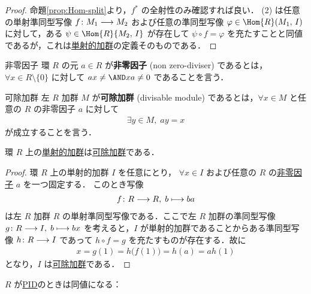\documentclass[algtopo_main]{subfiles}
\begin{document}
\begin{proof}
    命題\ref{prop:Hom-split}より，$f^*$ の全射性のみ確認すれば良い．
    (2) は任意の単射準同型写像 $f \colon M_1 \longrightarrow M_2$ および任意の準同型写像 $\varphi \in \Hom{R}(M_1,\, I)$ に対して，ある $\psi \in \Hom{R}{M_2,\, I}$ が存在して $\psi \circ f = \varphi$ を充たすことと同値であるが，これは\hyperref[def:inj-mod]{単射的加群}の定義そのものである．
\end{proof}

\begin{mydef}[label=def:non-zero-diviser]{非零因子}
    環 $R$ の元 $a \in R$ が\textbf{非零因子} (non zero-diviser) であるとは，$\forall x \in R \setminus \{0\}$ に対して $ax \neq \AND xa \neq 0$ であることを言う．
\end{mydef}


\begin{mydef}[label=def:divisable-mod]{可除加群}
    左 $R$ 加群 $M$ が\textbf{可除加群} (divisable module) であるとは，$\forall x \in M$ と任意の $R$ の非零因子 $a$ に対して
    \begin{align}
        \exists y \in M,\; ay = x
    \end{align}
    が成立することを言う．
\end{mydef}

\begin{myprop}[label=prop:inj-mod-divisable]{}
    環 $R$ 上の\hyperref[def:inj-mod]{単射的加群}は\hyperref[def:divisable-mod]{可除加群}である．
\end{myprop}

\begin{proof}
    環 $R$ 上の単射的加群 $I$ を任意にとり，
    $\forall x \in I$ および任意の $R$ の\hyperref[def:non-zero-diviser]{非零因子} $a$ を一つ固定する．
    このとき写像
    \begin{align}
        f \colon R \longrightarrow R,\; b \longmapsto ba
    \end{align}
    は左 $R$ 加群 $R$ の単射準同型写像である．ここで左 $R$ 加群の準同型写像 $g \colon R \longrightarrow I,\; b \longmapsto bx$ 
    を考えると，$I$ が単射的加群であることからある準同型写像 $h \colon R \longrightarrow I$ であって $h \circ f = g$ を充たすものが存在する．故に
    \begin{align}
        x = g(1) = h \bigl( f(1) \bigr) = h(a) = a h(1)
    \end{align}
    となり，$I$ は\hyperref[def:divisable-mod]{可除加群}である．
\end{proof}

$R$ が\hyperref[def:PID]{PID}のときは同値になる：
\end{document}
